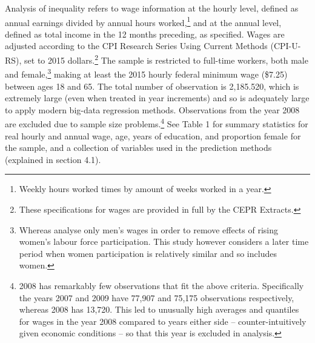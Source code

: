 \documentclass[notitlepage,12pt]{article}
\begin{document}
Analysis of inequality refers to wage information at the hourly level, defined as annual earnings divided by annual hours worked,\footnote{Weekly hours worked times by amount of weeks worked in a year.} and at the annual level, defined as total income in the 12 months preceding, as specified.  Wages are adjusted according to the CPI Research Series Using Current Methods (CPI-U-RS), set to 2015 dollars.\footnote{These specifications for wages are provided in full by the CEPR Extracts.}  The sample is restricted to full-time workers, both male and female,\footnote{Whereas \cite{juhn1993wage} analyse only men's wages in order to remove effects of rising women's labour force participation.  This study however considers a later time period when women participation is relatively similar and so includes women.} making at least the 2015 hourly federal minimum wage (\$7.25) between ages 18 and 65.  The total number of observation is 2,185.520, which is extremely large (even when treated in year increments) and so is adequately large to apply modern big-data regression methods.\nocite{varian2014big}  Observations from the year 2008 are excluded due to sample size problems.\footnote{2008 has remarkably few observations that fit the above criteria.  Specifically the years 2007 and 2009 have 77,907 and 75,175 observations respectively, whereas 2008 has 13,720.  This led to unusually high averages and quantiles for wages in the year 2008 compared to years either side -- counter-intuitively given economic conditions -- so that this year is excluded in analysis.}  See Table 1 for summary statistics for real hourly and annual wage, age, years of education, and proportion female for the sample, and a collection of variables used in the prediction methods (explained in section 4.1).
\end{document}
